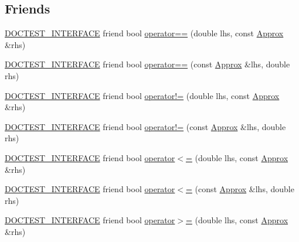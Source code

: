 \subsection*{Friends}
\begin{DoxyCompactItemize}
\item 
\mbox{\hyperlink{doctest_8h_a9c16ffc635ec47f07797d21ede26b1a5}{D\+O\+C\+T\+E\+S\+T\+\_\+\+I\+N\+T\+E\+R\+F\+A\+CE}} friend bool \mbox{\hyperlink{classdoctest_1_1_approx_a2b6b56551f113fd12f4a52b4d3e5fd7e}{operator==}} (double lhs, const \mbox{\hyperlink{classdoctest_1_1_approx}{Approx}} \&rhs)
\item 
\mbox{\hyperlink{doctest_8h_a9c16ffc635ec47f07797d21ede26b1a5}{D\+O\+C\+T\+E\+S\+T\+\_\+\+I\+N\+T\+E\+R\+F\+A\+CE}} friend bool \mbox{\hyperlink{classdoctest_1_1_approx_a1b99d0c4c3924a253474e68ae30e1175}{operator==}} (const \mbox{\hyperlink{classdoctest_1_1_approx}{Approx}} \&lhs, double rhs)
\item 
\mbox{\hyperlink{doctest_8h_a9c16ffc635ec47f07797d21ede26b1a5}{D\+O\+C\+T\+E\+S\+T\+\_\+\+I\+N\+T\+E\+R\+F\+A\+CE}} friend bool \mbox{\hyperlink{classdoctest_1_1_approx_a44d4bbc575291095c884848887538233}{operator!=}} (double lhs, const \mbox{\hyperlink{classdoctest_1_1_approx}{Approx}} \&rhs)
\item 
\mbox{\hyperlink{doctest_8h_a9c16ffc635ec47f07797d21ede26b1a5}{D\+O\+C\+T\+E\+S\+T\+\_\+\+I\+N\+T\+E\+R\+F\+A\+CE}} friend bool \mbox{\hyperlink{classdoctest_1_1_approx_ae86972ba14656f422afdcc60cd2cdb08}{operator!=}} (const \mbox{\hyperlink{classdoctest_1_1_approx}{Approx}} \&lhs, double rhs)
\item 
\mbox{\hyperlink{doctest_8h_a9c16ffc635ec47f07797d21ede26b1a5}{D\+O\+C\+T\+E\+S\+T\+\_\+\+I\+N\+T\+E\+R\+F\+A\+CE}} friend bool \mbox{\hyperlink{classdoctest_1_1_approx_af2fef67cf4508a446eeaf38dafae661f}{operator$<$=}} (double lhs, const \mbox{\hyperlink{classdoctest_1_1_approx}{Approx}} \&rhs)
\item 
\mbox{\hyperlink{doctest_8h_a9c16ffc635ec47f07797d21ede26b1a5}{D\+O\+C\+T\+E\+S\+T\+\_\+\+I\+N\+T\+E\+R\+F\+A\+CE}} friend bool \mbox{\hyperlink{classdoctest_1_1_approx_a7f32e572caa5ee152b8ade301fcfd838}{operator$<$=}} (const \mbox{\hyperlink{classdoctest_1_1_approx}{Approx}} \&lhs, double rhs)
\item 
\mbox{\hyperlink{doctest_8h_a9c16ffc635ec47f07797d21ede26b1a5}{D\+O\+C\+T\+E\+S\+T\+\_\+\+I\+N\+T\+E\+R\+F\+A\+CE}} friend bool \mbox{\hyperlink{classdoctest_1_1_approx_acf882dbff26c57cd8404da3edd46f45e}{operator$>$=}} (double lhs, const \mbox{\hyperlink{classdoctest_1_1_approx}{Approx}} \&rhs)

\end{DoxyCompactItemize}
